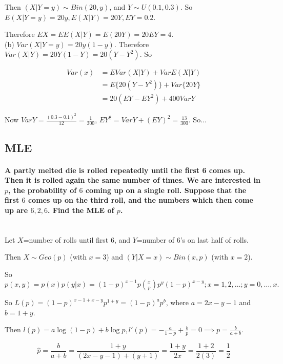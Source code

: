 \documentclass[a4paper, 11pt, twoside]{article}
\begin{document}
Then $(X|Y=y)\sim Bin(20,y)$, and $Y\sim U(0.1, 0.3)$. So $E(X|Y=y)=20y, E(X|Y)=20Y, EY=0.2$.

Therefore $EX=EE(X|Y)= E(20Y)=20EY=4$.\\

(b) $Var(X|Y=y)=20y(1-y).$ Therefore $Var(X|Y)=20Y(1-Y)=20(Y-Y^2)$. So

\[\begin{split}
Var(x)&=EVar(X|Y)+VarE(X|Y)\\
&=E\{20(Y-Y^2)\}+Var\{20Y\}\\
&=20(EY-EY^2)+400VarY	
\end{split}
\]

Now $VarY=\frac{(0.3-0.1)^2}{12}=\frac{1}{300}$, $EY^2=VarY+(EY)^2=\frac{13}{300}$. So...\\

\subsection{MLE}

\paragraph{A partly melted die is rolled repeatedly until the first 6 comes up. Then it is rolled again the same number of times. We are interested in $p$, the probability of $6$ coming up on a single roll. Suppose that the first $6$ comes up on the third roll, and the numbers which then come up are $6,2,6$. Find the MLE of $p$.}\ \\

Let $X$=number of rolls until first 6, and $Y$=number of $6$'s on last half of rolls.

Then $X\sim Geo(p)$ (with $x=3$) and $(Y|X=x)\sim Bin(x,p)$ (with $x=2$).

So $p(x,y)=p(x)p(y|x)=(1-p)^{x-1}p{x\choose p}p^y(1-p)^{x-y}; x=1,2,\dots; y=0,\dots,x.$

So $L(p)=(1-p)^{x-1+x-y}p^{1+y}=(1-p)^ap^b$, where $a=2x-y-1$ and $b=1+y$.

Then $l(p)=a\log(1-p)+b\log p, l'(p)=-\frac{a}{1-p}+\frac{b}{p}=0\implies p=\frac{b}{a+b}.$

\[\hat{p}=\frac{b}{a+b}=\frac{1+y}{(2x-y-1)+(y+1)}=\frac{1+y}{2x}=\frac{1+2}{2(3)}=\frac{1}{2}\]
\end{document}
